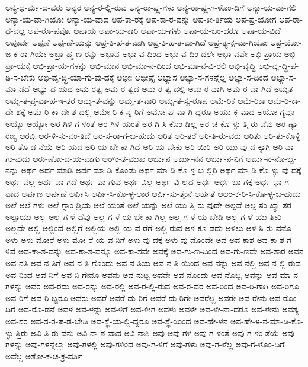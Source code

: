 {ಅನ್ಯ-ಧ-ರ್ಮ-ದ-ವರು
ಅನ್ಯರ
ಅನ್ಯ-ರ-ಲ್ಲಿ-ರುವ
ಅನ್ಯ-ರಾ-ಷ್ಟ್ರ-ಗಳು
ಅನ್ಯ-ರಾ-ಷ್ಟ್ರ-ಗ-ಳೊಂ-ದಿಗೆ
ಅನ್ಯಾ-ಯ-ವಾ-ಗಲಿ
ಅನ್ಯಾ-ಯ-ವಾ-ಗಿಯೋ
ಅನ್ಯಾ-ಯ-ವಾದ
ಅಪ-ಕಾ-ರಕ್ಕೆ
ಅಪ-ಕಾ-ರ-ವನ್ನು
ಅಪ-ಕೀ-ರ್ತಿಯ
ಅಪ-ಪ್ರ-ಯೋಗ
ಅಪ-ರಾ-ಧ-ವಲ್ಲ
ಅಪ-ರೂ-ಪವೋ
ಅಪಾಯ
ಅಪಾ-ಯ-ಕಾರಿ
ಅಪಾ-ಯ-ಗಳು
ಅಪಾ-ಯ-ಬಂ-ದರೂ
ಅಪಾ-ಯ-ವಿದೆ
ಅಪೂರ್ವ
ಅಪ್ಪಣೆ
ಅಪ್ಪ-ಣೆ-ಯನ್ನು
ಅಪ್ರ-ತಿ-ಹ-ತ-ವಾಗಿ
ಅಪ್ರ-ತಿ-ಹ-ತ-ವಾ-ಗಿದೆ
ಅಪ್ರ-ತ್ಯ-ಕ್ಷ-ವಾ-ಗಿಯೋ
ಅಪ್ರ-ಯೋ-ಜ-ಕ-ರಾ-ಗಿಯೇ
ಅಬ್ರಾ-ಹ್ಮ-ಣ-ರನ್ನು
ಅಭಾವ
ಅಭಾ-ವ-ದಿಂದ
ಅಭಾ-ವ-ದಿಂ-ದಲೇ
ಅಭಾ-ವವೇ
ಅಭಿ-ಪ್ರಾಯ
ಅಭಿ-ಪ್ರಾ-ಯಕ್ಕೆ
ಅಭಿ-ಪ್ರಾ-ಯ-ಗಳನ್ನು
ಅಭಿ-ಮಾನ
ಅಭಿ-ಮಾ-ನ-ದಿಂದ
ಅಭಿ-ಮಾ-ನ-ವಿ-ರಲಿ
ಅಭಿ-ವೃದ್ಧಿ
ಅಭಿ-ವೃ-ದ್ಧಿ-ಪ-ಡಿ-ಸ-ಬೇಕು
ಅಭಿ-ವೃ-ದ್ಧಿ-ಯಾ-ಗು-ವು-ದಕ್ಕೆ
ಅಭೀಃ
ಅಭೀಪ್ಸೆ
ಅಭ್ಯಾಸ
ಅಭ್ಯಾ-ಸ-ಗಳನ್ನೆಲ್ಲ
ಅಭ್ಯಾ-ಸ-ದಿಂದ
ಅಭ್ಯಾ-ಸ-ಮಾ-ಡದೆ
ಅಭ್ಯು-ದ-ಯದ
ಅಮ-ರತ್ವ
ಅಮ-ರ-ತ್ವದ
ಅಮ-ರ-ತ್ವ-ದಲ್ಲಿ
ಅಮ-ರ-ವಾಗಿ
ಅಮ-ರ-ವಾ-ಗಿದೆ
ಅಮೃತ
ಅಮೃ-ತ-ಪ್ರ-ವಾ-ಹ-ಇ-ತರ
ಅಮೃ-ತ-ವನ್ನು
ಅಮೃ-ತ-ವಾರಿ
ಅಮೃ-ತ-ಸ್ವ-ರೂಪ
ಅಮೆ-ರಿಕ
ಅಮೆ-ರಿಕಾ
ಅಮೆ-ರಿ-ಕಾ-ದೇ-ಶಕ್ಕೆ
ಅಮೆ-ರಿ-ಕಾ-ದೇ-ಶ-ದಲ್ಲಿ
ಅಮೇ-ರಿ-ಕ-ನ್ನ-ರಿಗೆ
ಅಮೋ-ಘ-ವಾ-ಗಿ-ದ್ದರೂ
ಅಯು-ಕ್ತ-ವಾದ
ಅಯೋ-ಗ್ಯವೂ
ಅಯ್ಯೊ
ಅಯ್ಯೋ
ಅರ-ಗಿಳಿ-ಗ-ಳಂತೆ
ಅರ-ಗಿಳಿ-ಯಂತೆ
ಅರ-ಗಿ-ಸಿ-ಕೊಂ-ಡಿಲ್ಲ
ಅರ-ಚಿ-ಕೊ-ಳ್ಳು-ತ್ತಿ-ರು-ವೆವು
ಅರ-ಣ್ಯಾ-ರಣ್ಯ
ಅರಬ್ಬಿ
ಅರ-ಳಿ-ಸು-ವಂ-ತಿದೆ
ಅರ-ಸ-ರಾ-ಗ-ಬ-ಹುದು
ಅರಿತ
ಅರಿ-ತರೆ
ಅರಿ-ತಿ-ರು-ವರು
ಅರಿತು
ಅರಿ-ತು-ಕೊಳ್ಳಿ
ಅರಿ-ತೊ-ಡ-ನೆಯೆ
ಅರಿ-ಯದ
ಅರಿ-ಯ-ಬೇ-ಕಾ-ಗಿದೆ
ಅರಿ-ಯ-ಬೇಕು
ಅರಿ-ಯಿರಿ
ಅರಿ-ಯು-ವು-ದ-ಕ್ಕಾಗಿ
ಅರಿ-ವಾ-ಗು-ವುದು
ಅರು-ಣೋ-ದ-ಯ-ವಾಗು
ಅರ್ಂ-ತ-ಮುಖ
ಅರ್ಜುನ
ಅರ್ಜು-ನನ
ಅರ್ಜು-ನ-ನಿಗೆ
ಅರ್ಜು-ನ-ನೊ-ಬ್ಬ-ನನ್ನು
ಅರ್ಥ
ಅರ್ಥ-ಮಾಡಿ
ಅರ್ಥ-ಮಾ-ಡಿ-ಕೊಂಡು
ಅರ್ಥ-ಮಾ-ಡಿ-ಕೊ-ಳ್ಳ-ಬ-ಲ್ಲಿರಿ
ಅರ್ಥ-ಮಾ-ಡಿ-ಕೊ-ಳ್ಳು-ವು-ದಕ್ಕೆ
ಅರ್ಥ-ವಲ್ಲ
ಅರ್ಥ-ವಾ-ಗದೆ
ಅರ್ಥ-ವಾ-ಗುವ
ಅರ್ಥ-ವಿಲ್ಲ
ಅರ್ಥ-ವಿ-ಲ್ಲದ
ಅರ್ಧ
ಅರ್ಧ-ಭಾ-ಗಕ್ಕೆ
ಅರ್ಧ-ಭಾ-ಗ-ವಾದ
ಅರ್ಪಣ
ಅರ್ಪಣೆ
ಅರ್ಪಿಸಿ
ಅರ್ಪಿ-ಸಿ-ಕೊ-ಳ್ಳ-ಲಾರ
ಅರ್ಪಿ-ಸು-ತ್ತೇನೆ
ಅರ್ಹತೆ
ಅಲಂ-ಕ-ರಿ-ಸಿ-ಕೊ-ಳ್ಳ-ಬ-ಹುದು
ಅಲೆ
ಅಲೆ-ಗಳು
ಅಲೆ-ಗ್ಸಾಂ-ಡ್ರಿಯ
ಅಲೆ-ಯಂತೆ
ಅಲೆ-ಯನ್ನು
ಅಲೆ-ಯು-ತ್ತಿ-ರು-ವುದೇ
ಅಲ್ಪವೆ
ಅಲ್ಪ-ಸಂ-ಖ್ಯಾ-ತರ
ಅಲ್ಪಾಯು
ಅಲ್ಲ
ಅಲ್ಲ-ಗ-ಳೆ-ದೆವು
ಅಲ್ಲ-ಗ-ಳೆ-ಯ-ಬೇ-ಕಾ-ಗಿಲ್ಲ
ಅಲ್ಲ-ಗ-ಳೆ-ಯ-ಬೇಡಿ
ಅಲ್ಲ-ಗ-ಳೆ-ಯು-ತ್ತೀರಿ
ಅಲ್ಲದೇ
ಅಲ್ಲಿ
ಅಲ್ಲಿಂದ
ಅಲ್ಲಿಗೆ
ಅಲ್ಲಿಯ
ಅಲ್ಲಿ-ಯ-ವ-ರೆಗೆ
ಅಲ್ಲಿ-ರುವ
ಅಳ-ಕೂ-ಡದು
ಅಳಿಲು
ಅಳಿ-ಸಿ-ರು-ವನೊ
ಅಳು
ಅಳು-ಮೋರೆ
ಅಳು-ಮೋ-ರೆ-ಯ-ವ-ನಿಗೆ
ಅಳು-ವು-ದಕ್ಕೆ
ಅಳು-ವು-ದೊಂದೇ
ಅವ
ಅವ-ಕಾಶ
ಅವ-ಕಾ-ಶ-ಗ-ಳಿವೆ
ಅವ-ಕಾ-ಶ-ವನ್ನು
ಅವ-ಕಾ-ಶ-ವನ್ನೂ
ಅವ-ಕಾ-ಶವೇ
ಅವಕ್ಕೆ
ಅವ-ಗು-ಣ-ದಿಂದ
ಅವ-ಗು-ಣವೇ
ಅವ-ತಾರ
ಅವನ
ಅವ-ನತಿ
ಅವ-ನ-ತಿಗೆ
ಅವ-ನ-ತಿ-ಗೊಂದು
ಅವ-ನ-ತಿಯ
ಅವ-ನ-ತಿ-ಯಿಂದ
ಅವ-ನನ್ನು
ಅವ-ನಲ್ಲಿ
ಅವ-ನ-ಲ್ಲಿ-ರುವ
ಅವ-ನಿಂದ
ಅವ-ನಿಗೆ
ಅವ-ನಿ-ಗೇನೂ
ಅವನು
ಅವ-ನುಟ್ಟ
ಅವನೇ
ಅವ-ನೊಂದು
ಅವ-ನೊಬ್ಬ
ಅವನ್ನು
ಅವ-ಮಾ-ನ-ಗಳನ್ನು
ಅವರ
ಅವ-ರದು
ಅವ-ರನ್ನು
ಅವ-ರಲ್ಲಿ
ಅವ-ರ-ಲ್ಲಿ-ರುವ
ಅವ-ರ-ವರ
ಅವ-ರಿಂದ
ಅವ-ರಿ-ಗಾಗಿ
ಅವ-ರಿಗೂ
ಅವ-ರಿಗೆ
ಅವ-ರಿ-ಬ್ಬರೂ
ಅವರು
ಅವರೆ
ಅವರೆ-ದು-ರಿಗೆ
ಅವರೆ-ದು-ರಿಗೇ
ಅವರೆಲ್ಲ
ಅವರೇ
ಅವ-ರೇನು
ಅವ-ರೊಂ-ದಿಗೆ
ಅವ-ರೊ-ಡನೆ
ಅವಳ
ಅವ-ಳನ್ನು
ಅವ-ಳಿಗೆ
ಅವ-ಳೀಗ
ಅವಳು
ಅವಳೇ
ಅವ-ಳೇ-ನಾ-ದರೂ
ಅವ-ಳೇನು
ಅವಶ್ಯ
ಅವ-ಸರ
ಅವ-ಸ-ರ-ಪ-ಡ-ಬೇಡಿ
ಅವ-ಸ್ಥೆ-ಯ-ಲ್ಲಿ-ದ್ದರೂ
ಅವ-ಸ್ಥೆ-ಯಿಂದ
ಅವ-ಹೇ-ಳನ
ಅವ-ಹೇ-ಳ-ನ-ಮಾ-ಡಿ-ಕೊ-ಳ್ಳು-ತ್ತಿರು
ಅವಿ-ತಿ-ರು-ವನು
ಅವಿ-ನಾ-ಶ-ವಾದ
ಅವಿ-ನಾಶಿ
ಅವು
ಅವು-ಗಳ
ಅವು-ಗ-ಳಂತೆ
ಅವು-ಗ-ಳಂ-ತೆಯೆ
ಅವು-ಗಳನ್ನು
ಅವು-ಗಳನ್ನೆಲ್ಲಾ
ಅವು-ಗಳಲ್ಲಿ
ಅವು-ಗಳಿಂದ
ಅವು-ಗ-ಳಿಗೆ
ಅವು-ಗಳು
ಅವು-ಗ-ಳೆಲ್ಲ
ಅವು-ಗ-ಳೊಂ-ದಿಗೆ
ಅವೆಲ್ಲ
ಅಶೋ-ಕ-ಚ-ಕ್ರ-ವರ್ತಿ
}
